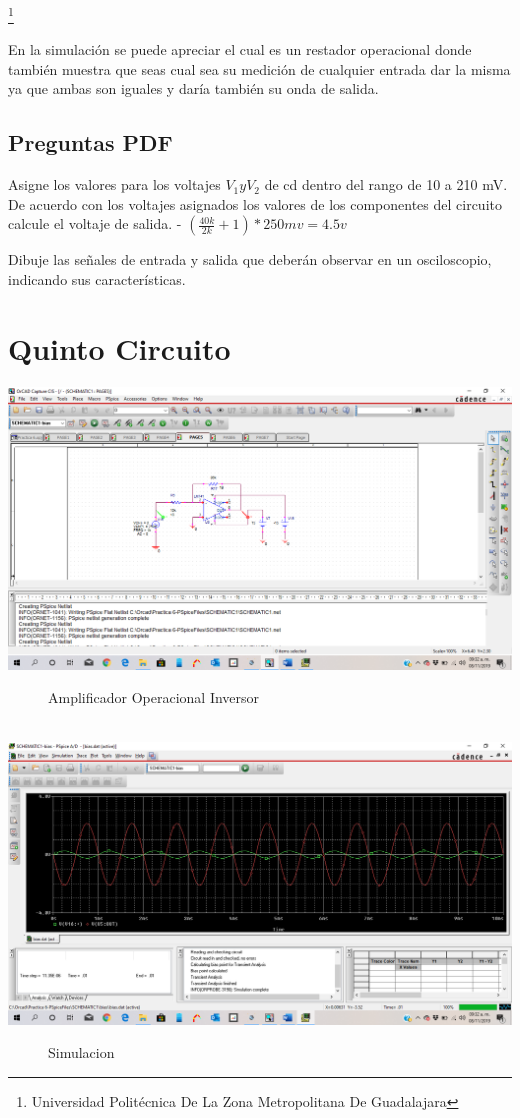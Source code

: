 \documentclass[10pt,a4paper]{article}
\begin{document}
\footnote{Universidad Politécnica De La Zona Metropolitana De Guadalajara} 

\newpage

En la simulación se puede apreciar el cual es un restador operacional donde también muestra que seas cual sea su medición de cualquier entrada dar la misma ya que ambas son iguales y daría también su onda de salida.

\subsection{Preguntas PDF}


Asigne los valores para los voltajes $V_1 y V_2$ de cd dentro del rango de 10 a 210 mV. De acuerdo con los voltajes asignados los valores de los componentes del circuito calcule el voltaje de salida. - $(\frac{40k}{2k} + 1) * 250mv = 4.5v$ 

Dibuje las señales de entrada y salida que deberán observar en un osciloscopio, indicando sus características.

\section{Quinto Circuito}
\begin{center}
 \includegraphics[scale=0.2]{9.png}
 \begin{figure}[hbtp]
 \caption{Amplificador Operacional Inversor}
 \centering
 \end{figure}\\
  \includegraphics[scale=0.3]{10.png}
 \begin{figure}[hbtp]
 \caption{Simulacion}
 \centering
 \end{figure} 
\end{center}
\end{document}
